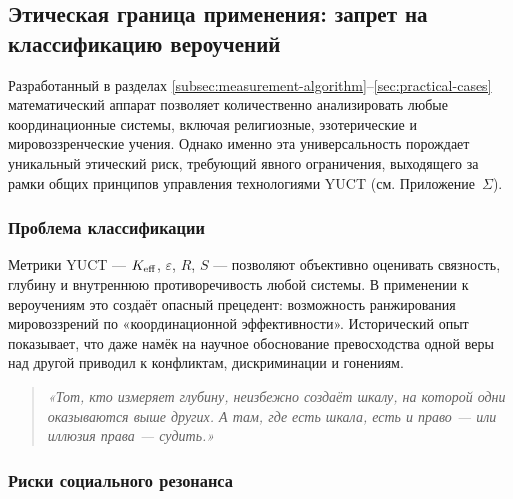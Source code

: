 \documentclass[12pt,a4paper]{article}
\newcommand{\eps}{\varepsilon}
\begin{document}
	\subsection{Этическая граница применения: запрет на классификацию вероучений}
	\label{subsec:belief-classification}
	
	Разработанный в разделах \ref{subsec:measurement-algorithm}–\ref{sec:practical-cases} математический аппарат позволяет количественно анализировать любые координационные системы, включая религиозные, эзотерические и мировоззренческие учения. Однако именно эта универсальность порождает уникальный этический риск, требующий явного ограничения, выходящего за рамки общих принципов управления технологиями YUCT (см. Приложение~$\Sigma$).
	
	\subsubsection{Проблема классификации}
	
	Метрики YUCT — $\Keff$, $\eps$, $R$, $S$ — позволяют объективно оценивать связность, глубину и внутреннюю противоречивость любой системы. В применении к вероучениям это создаёт опасный прецедент: возможность ранжирования мировоззрений по «координационной эффективности». Исторический опыт показывает, что даже намёк на научное обоснование превосходства одной веры над другой приводил к конфликтам, дискриминации и гонениям.
	
	\begin{quote}
		\itshape
		«Тот, кто измеряет глубину, неизбежно создаёт шкалу, на которой одни оказываются выше других. А там, где есть шкала, есть и право — или иллюзия права — судить.»
	\end{quote}
	
	\subsubsection{Риски социального резонанса}
	
\end{document}
